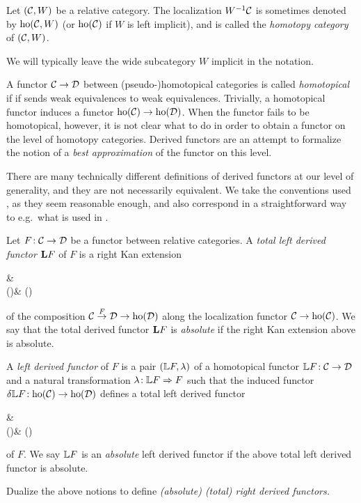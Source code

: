 \begin{notation}
	Let \((\mathcal{C},W)\) be a relative category. The localization \(W^{-1}\mathcal{C}\) is sometimes denoted by \(\operatorname{ho}(\mathcal{C},W)\) (or \(\operatorname{ho}(\mathcal{C})\) if \(W\) is left implicit), and is called the \emph{homotopy category} of \((\mathcal{C},W)\).

	We will typically leave the wide subcategory \(W\) implicit in the notation.
\end{notation}

A functor \(\mathcal{C}\to\mathcal{D}\) between (pseudo-)homotopical categories is called \emph{homotopical} if if sends weak equivalences to weak equivalences. Trivially, a homotopical
functor induces a functor \(\operatorname{ho}(\mathcal{C})\to\operatorname{ho}(\mathcal{D})\). When the functor fails to be homotopical, however, it is not clear what to do in
order to obtain a functor on the level of homotopy categories. Derived functors are an attempt to formalize the notion of a \emph{best approximation} of the functor on this level.


There are many technically different definitions of derived functors at our level of generality, and they are not necessarily equivalent. We take the conventions used \cite{riehl-categorical-homotopy-theory},
as they seem reasonable enough, and also correspond in a straightforward way to e.g.\ what is used in \cite{kashiwara-schapira-book}.
\begin{definition}
	Let \(F\!:\mathcal{C}\to\mathcal{D}\) be a functor between relative categories. A \emph{total left derived functor} \(\mathbf{L} F\) of \(F\) is a right Kan extension
	\begin{diagram*}
		\calC\ar[r,"F"]\ar[d,"\gamma"'] & \calD\ar[d,"\delta"] \\
		\ho(\calC) & \ho(\calD)\ar[from=l,to=u,Rightarrow,shorten=2mm]
	\end{diagram*}
	of the composition \(\mathcal{C}\overset{F}\to\mathcal{D}\to\operatorname{ho}(\mathcal{D})\) along the localization functor \(\mathcal{C}\to\operatorname{ho}(\mathcal{C})\). We say that the total derived functor \(\mathbf{L} F\) is \emph{absolute}
	if the right Kan extension above is absolute.

	A \emph{left derived functor} of \(F\) is a pair \((\mathbb{L} F,\lambda)\) of a homotopical functor \(\mathbb{L} F\!:\mathcal{C}\to\mathcal{D}\) and a natural transformation \(\lambda\!:\mathbb{L} F\Rightarrow F\)
	such that the induced functor \(\delta\mathbb{L} F\!:\operatorname{ho}(\mathcal{C})\to\operatorname{ho}(\mathcal{D})\) defines a total left derived functor
	\begin{diagram*}
		\calC\ar[r,"F"]\ar[d,"\gamma"'] & \calD\ar[d,"\delta"] \\
		\ho(\calC) & \ho(\calD)\ar[from=l,to=u,Rightarrow,"\delta\lambda"',shorten=2mm]
	\end{diagram*}
	of \(F\). We say \(\mathbb{L} F\) is an \emph{absolute} left derived functor if the above total left derived functor is absolute.
\end{definition}
\begin{exercise}
	Dualize the above notions to define \emph{(absolute) (total) right derived functors.}
\end{exercise}

